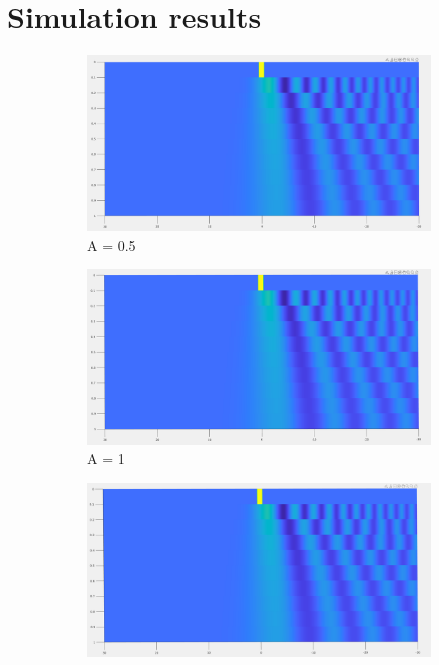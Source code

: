 \documentclass{article}
\begin{document}
\section{Simulation results}
\begin{figure}[H]
\centering
\begin{subfigure}[b]{60mm}
\includegraphics[scale=0.1]{figures/infl0p5H.png}
\caption{A = 0.5}
\label{fig:}
\end{subfigure}
\begin{subfigure}[b]{60mm}
\includegraphics[scale=0.1]{figures/infl1H.png}
\caption{A = 1}
\label{fig:}
\end{subfigure}
\begin{subfigure}[b]{60mm}
\includegraphics[scale=0.1]{figures/infl1p5H.png}

\end{subfigure}
\end{figure}
\end{document}
